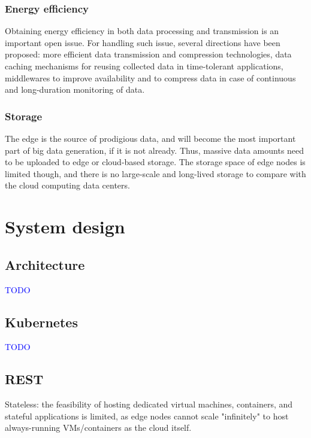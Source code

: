 \documentclass{ieeeaccess}
\begin{document}
\subsubsection{Energy efficiency}

Obtaining energy efficiency in both data processing and transmission is an important open issue. For handling such issue, several directions have been proposed: more efficient data transmission and compression technologies, data caching mechanisms for reusing collected data in time-tolerant applications, middlewares to improve availability and to compress data in case of continuous and long-duration monitoring of data.

\subsubsection{Storage}

The edge is the source of prodigious data, and will become the most important part of big data generation, if it is not already. Thus, massive data amounts need to be uploaded to edge or cloud-based storage. The storage space of edge nodes is limited though, and there is no large-scale and long-lived storage to compare with the cloud computing data centers.

\section{System design}
\label{sec:technicals}

\subsection{Architecture}

\textcolor{blue}{TODO}

\subsection{Kubernetes}

\textcolor{blue}{TODO}

\subsection{REST}

Stateless: the feasibility of hosting dedicated virtual machines, containers, and stateful applications is limited, as edge nodes cannot scale "infinitely" to host always-running VMs/containers as the cloud itself.
\end{document}
